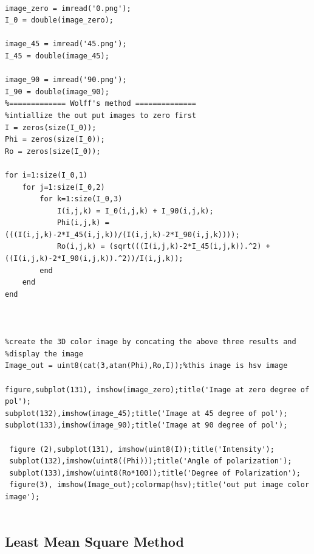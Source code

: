 \documentclass{article}
\begin{document}
	\begin{lstlisting}[label=exercices-h-traversal,caption=Wolffs]	

image_zero = imread('0.png');
I_0 = double(image_zero);

image_45 = imread('45.png');
I_45 = double(image_45);

image_90 = imread('90.png');
I_90 = double(image_90);
%============= Wolff's method ==============
%intiallize the out put images to zero first
I = zeros(size(I_0));
Phi = zeros(size(I_0));
Ro = zeros(size(I_0));

for i=1:size(I_0,1)
    for j=1:size(I_0,2)
        for k=1:size(I_0,3)
            I(i,j,k) = I_0(i,j,k) + I_90(i,j,k);
            Phi(i,j,k) = (((I(i,j,k)-2*I_45(i,j,k))/(I(i,j,k)-2*I_90(i,j,k))));
            Ro(i,j,k) = (sqrt(((I(i,j,k)-2*I_45(i,j,k)).^2) + ((I(i,j,k)-2*I_90(i,j,k)).^2))/I(i,j,k));
        end
    end
end



%create the 3D color image by concating the above three results and
%display the image
Image_out = uint8(cat(3,atan(Phi),Ro,I));%this image is hsv image 

figure,subplot(131), imshow(image_zero);title('Image at zero degree of pol');
subplot(132),imshow(image_45);title('Image at 45 degree of pol');
subplot(133),imshow(image_90);title('Image at 90 degree of pol');

 figure (2),subplot(131), imshow(uint8(I));title('Intensity');
 subplot(132),imshow(uint8((Phi)));title('Angle of polarization');
 subplot(133),imshow(uint8(Ro*100));title('Degree of Polarization');
 figure(3), imshow(Image_out);colormap(hsv);title('out put image color image');
 
	\end{lstlisting}
	
	\subsection{Least Mean Square Method}
	
\end{document}
